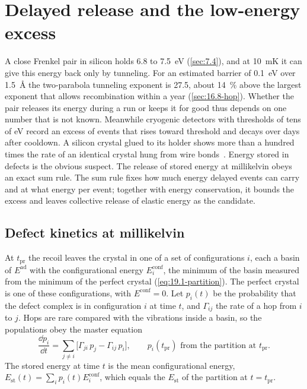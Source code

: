 \section{Delayed release and the low-energy excess}\label{sec:19.6}

A close Frenkel pair in silicon holds 6.8 to \SI{7.5}{eV} (\cref{sec:7.4}), and at \SI{10}{mK} it can give this energy back only by tunneling. For an estimated barrier of \SI{0.1}{eV} over \SI{1.5}{\angstrom} the two-parabola tunneling exponent is 27.5, about \SI{14}{\percent} above the largest exponent that allows recombination within a year (\cref{sec:16.8-hop}). Whether the pair releases its energy during a run or keeps it for good thus depends on one number that is not known. Meanwhile cryogenic detectors with thresholds of tens of eV record an excess of events that rises toward threshold and decays over days after cooldown. A silicon crystal glued to its holder shows more than a hundred times the rate of an identical crystal hung from wire bonds~\cite{anthonypetersen2024stress}. Energy stored in defects is the obvious suspect. The release of stored energy at millikelvin obeys an exact sum rule. The sum rule fixes how much energy delayed events can carry and at what energy per event; together with energy conservation, it bounds the excess and leaves collective release of elastic energy as the candidate.

\subsection{Defect kinetics at millikelvin}\label{sec:19.6-kinetics}

At $t_{\mathrm{pr}}$ the recoil leaves the crystal in one of a set of configurations $i$, each a basin of $E^{\mathrm{ad}}$ with the configurational energy $E^{\mathrm{conf}}_i$, the minimum of the basin measured from the minimum of the perfect crystal (\cref{eq:19.1-partition}). The perfect crystal is one of these configurations, with $E^{\mathrm{conf}} = 0$. Let $p_i(t)$ be the probability that the defect complex is in configuration $i$ at time $t$, and $\varGamma_{ij}$ the rate of a hop from $i$ to $j$. Hops are rare compared with the vibrations inside a basin, so the populations obey the master equation
\begin{equation}
  \frac{\dd p_i}{\dd t} = \sum_{j\ne i}\bigl[\varGamma_{ji}\,p_j - \varGamma_{ij}\,p_i\bigr] ,
  \qquad p_i(t_{\mathrm{pr}}) \text{ from the partition at } t_{\mathrm{pr}} .
  \label{eq:19.6-master}
\end{equation}
The stored energy at time $t$ is the mean configurational energy, $E_{\mathrm{st}}(t) = \sum_ip_i(t)E^{\mathrm{conf}}_i$, which equals the $E_{\mathrm{st}}$ of the partition at $t = t_{\mathrm{pr}}$.

